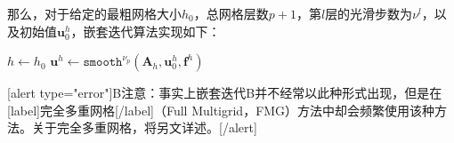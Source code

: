 \documentclass[12pt, UTF8, nofonts]{ctexart}
\begin{document}
那么，对于给定的最粗网格大小$h_0$，总网格层数$p+1$，第$l$层的光滑步数为$\nu^{l}$，以及初始值$\boldsymbol{u}_{0}^h$，嵌套迭代算法实现如下：

\begin{algorithm}[H]
    $h \gets h_{0}$ \;
    $\boldsymbol{u}^h \gets \texttt{smooth}^{\nu_{p}}(\boldsymbol{A}_h,\boldsymbol{u}_0^h,\boldsymbol{f}^h)$ \;
\end{algorithm}

[alert type="error"]B注意：事实上嵌套迭代B并不经常以此种形式出现，但是在[label]完全多重网格[/label]（Full Multigrid，FMG）方法中却会频繁使用该种方法。关于完全多重网格，将另文详述。[/alert]


\end{document}
